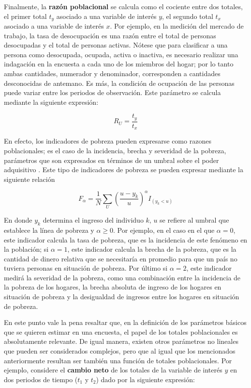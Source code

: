 \documentclass[
  12pt,
]{book}
\begin{document}
Finalmente, la \textbf{razón poblacional} se calcula como el cociente entre dos totales, el primer total \(t_y\) asociado a una variable de interés \(y\), el segundo total \(t_x\) asociado a una variable de interés \(x\). Por ejemplo, en la medición del mercado de trabajo, la tasa de desocupación es una razón entre el total de personas desocupadas y el total de personas activas. Nótese que para clasificar a una persona como desocupada, ocupada, activa o inactiva, es necesario realizar una indagación en la encuesta a cada uno de los miembros del hogar; por lo tanto ambas cantidades, numerador y denominador, corresponden a cantidades desconocidas de antemano. Es más, la condición de ocupación de las personas puede variar entre los periodos de observación. Este parámetro se calcula mediante la siguiente expresión:

\[R_U=\frac{t_y}{t_x}\]

En efecto, los indicadores de pobreza pueden expresarse como razones poblacionales; es el caso de la incidencia, brecha y severidad de la pobreza, parámetros que son expresados en términos de un umbral sobre el poder adquisitivo \citep{Foster_Greer_Thorbecke_1984}. Este tipo de indicadores de pobreza se pueden expresar mediante la siguiente relación

\[
F_{\alpha} = \frac{1}{N} \sum_U \left(\frac{u-y_k}{u}\right)^{\alpha}I_{(y_k < u)}
\]

En donde \(y_k\) determina el ingreso del individuo \(k\), \(u\) se refiere al umbral que establece la línea de pobreza y \(\alpha \geq 0\). Por ejemplo, en el caso en el que \(\alpha = 0\), este indicador calcula la tasa de pobreza, que es la incidencia de este fenómeno en la población; si \(\alpha = 1\), este indicador calcula la brecha de la pobreza, que es la cantidad de dinero relativa que se necesitaría en promedio para que un país no tuviera personas en situación de pobreza. Por último si \(\alpha = 2\), este indicador medirá la severidad de la pobreza, como una combinación entre la incidencia de la pobreza de los hogares, la brecha absoluta de ingreso de los hogares en situación de pobreza y la desigualdad de ingresos entre los hogares en situación de pobreza.

En este punto vale la pena resaltar que, en la definición de los parámetros básicos que se quieren estimar en una encuesta, el papel de los totales poblacionales es absolutamente relevante. De igual manera, existen otros parámetros no lineales que pueden ser considerados complejos, pero que al igual que los mencionados anteriormente resultan ser también una función de totales poblacionales. Por ejemplo, considere el \textbf{cambio neto} de los totales de la variable de interés \(y\) en dos periodos de tiempo (\(t_1\) y \(t_2\)) dado por la siguiente expresión:
\end{document}
